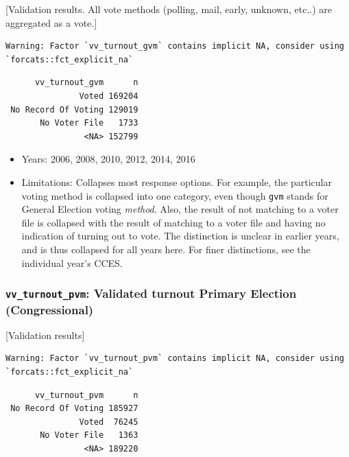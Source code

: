 \documentclass[10pt,article,oneside]{memoir}
\theoremstyle{definition}
\begin{document}
{[}Validation results. All vote methods (polling, mail, early, unknown,
etc..) are aggregated as a vote.{]}

\begin{verbatim}
Warning: Factor `vv_turnout_gvm` contains implicit NA, consider using
`forcats::fct_explicit_na`
\end{verbatim}

\begin{verbatim}
      vv_turnout_gvm      n
               Voted 169204
 No Record Of Voting 129019
       No Voter File   1733
                <NA> 152799
\end{verbatim}

\begin{itemize}
\tightlist
\item
  Years: 2006, 2008, 2010, 2012, 2014, 2016
\item
  Limitations: Collapses most response options. For example, the
  particular voting method is collapsed into one category, even though
  \texttt{gvm} stands for General Election voting \emph{method}. Also,
  the result of not matching to a voter file is collapsed with the
  result of matching to a voter file and having no indication of turning
  out to vote. The distinction is unclear in earlier years, and is thus
  collapsed for all years here. For finer distinctions, see the
  individual year's CCES.
\end{itemize}

\hypertarget{vv_turnout_pvm-validated-turnout-primary-election-congressional}{%
\subsubsection{\texorpdfstring{\texttt{vv\_turnout\_pvm}: Validated
turnout Primary Election
(Congressional)}{vv\_turnout\_pvm: Validated turnout Primary Election (Congressional)}}\label{vv_turnout_pvm-validated-turnout-primary-election-congressional}}

{[}Validation results{]}

\begin{verbatim}
Warning: Factor `vv_turnout_pvm` contains implicit NA, consider using
`forcats::fct_explicit_na`
\end{verbatim}

\begin{verbatim}
      vv_turnout_pvm      n
 No Record Of Voting 185927
               Voted  76245
       No Voter File   1363
                <NA> 189220
\end{verbatim}
\end{document}
